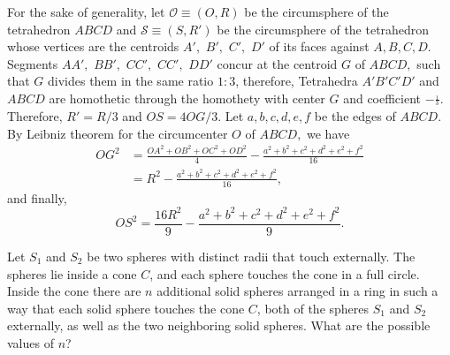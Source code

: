 \documentclass[12pt,a4paper]{memoir}
\theoremstyle{definition}
\begin{document}
\begin{solution}[name={Solution by Luis González}]
	For the sake of generality, let $\mathcal{O} \equiv (O,R)$ be the circumsphere of the tetrahedron $ABCD$ and $ \mathcal{S} \equiv (S,R')$ be the circumsphere of the tetrahedron whose vertices are the centroids $A',$ $B',$ $C',$ $D'$ of its faces against $A,B,C,D.$ Segments $AA',$ $ BB',$ $ CC',$ $ CC',$ $DD'$ concur at the centroid $G$ of $ABCD,$ such that $G$ divides them in the same ratio $1:3$, therefore, Tetrahedra $A'B'C'D'$ and $ABCD$ are homothetic through the homothety with center $G$ and coefficient $-\frac{_1}{^3}.$ Therefore, $R'=R/3$ and $OS=4OG/3.$ Let $a,b,c,d,e,f$ be the edges of $ABCD.$ By Leibniz theorem for the circumcenter $O$ of $ABCD,$ we have
	\begin{align*}
		OG^2 &= \frac{OA^2+OB^2+OC^2+OD^2}{4}-\frac{a^2+b^2+c^2+d^2+e^2+f^2}{16}\\
		&= R^2-\frac{a^2+b^2+c^2+d^2+e^2+f^2}{16},
	\end{align*}
	and finally,
	\[ OS^2=\frac{16R^2}{9}-\frac{a^2+b^2+c^2+d^2+e^2+f^2}{9}.\]
\end{solution}



\begin{question}[name={1987 IMO Longlist}]
	Let $S_1$ and $S_2$ be two spheres with distinct radii that touch externally. The spheres lie inside a cone $C$, and each sphere touches the cone in a full circle. Inside the cone there are $n$ additional solid spheres arranged in a ring in such a way that each solid sphere touches the cone $C$, both of the spheres $S_1$ and $S_2$ externally, as well as the two neighboring solid spheres. What are the possible values of $n$?
\end{question}
\end{document}
